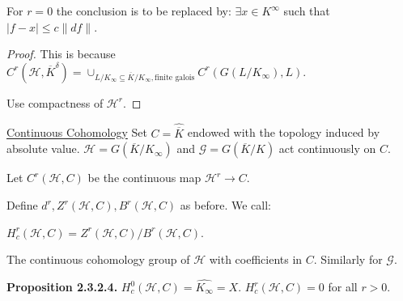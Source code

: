 \documentclass{article}
\theoremstyle{definition}
\numberwithin{theorem}{subsection}
\begin{document}
    For \(r = 0\) the conclusion is to be replaced by: \(\exists x\in K^{\infty}\) such that \(\vert f - x \vert \leq c \lVert df \rVert\).

    \begin{proof}
        This is because \(C^r(\mathscr{H}, \overline{K}^\delta) = \cup_{L / K_\infty \subseteq \overline{K} / K_\infty, \text{finite galois}} C^r(G(L / K_\infty), L)\).
        
        Use compactness of \(\mathscr{H}^r\).
    \end{proof}

    \underline{Continuous Cohomology} Set \(C = \widehat{\overline{K}}\) endowed with the topology induced by absolute value. \(\mathscr{H} = G(\overline{K} / K_\infty)\) and \(\mathscr{G} = G(\overline{K} / K)\) act continuously on \(C\).
    
    Let \(C^r(\mathscr{H}, C)\) be the continuous map \(\mathscr{H}^r \to C\).

    Define \(d^r, Z^r(\mathscr{H}, C), B^r(\mathscr{H}, C)\) as before. We call:

    \(H^r_c(\mathscr{H}, C) = Z^r(\mathscr{H}, C) / B^r(\mathscr{H}, C)\).

    The continuous cohomology group of \(\mathscr{H}\) with coefficients in \(C\). Similarly for \(\mathscr{G}\).

    \textbf{Proposition 2.3.2.4.} \(H^0_c(\mathscr{H}, C) = \widehat{K_\infty} = X\). \(H^r_c(\mathscr{H}, C) = 0\) for all \(r > 0\).
\end{document}
